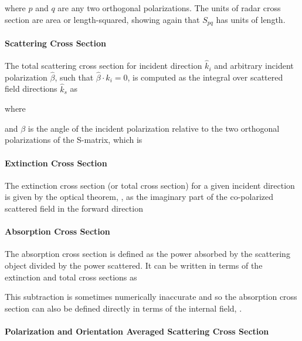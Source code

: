 \noindent where $p$ and $q$ are any two orthogonal polarizations. The units of radar cross section are area or length-squared, showing again that $S_{pq}$ has units of length.

\paragraph{Scattering Cross Section} The total scattering cross section for incident direction $\hat{k}_i$ and arbitrary incident polarization $\hat{\beta}$, such that $\hat{\beta} \cdot \hat{k}_i = 0$, is computed as the integral over scattered field directions $\hat{k}_s$ as

\noindent where

\noindent and $\beta$ is the angle of the incident polarization relative to the two orthogonal polarizations of the S-matrix, which is 

\paragraph{Extinction Cross Section} The extinction cross section (or total cross section) for a given incident direction is given by the optical theorem, \cite{zhang2019generalized}, as the imaginary part of the co-polarized scattered field in the forward direction

\paragraph{Absorption Cross Section} The absorption cross section is defined as the power absorbed by the scattering object divided by the power scattered. It can be written in terms of the extinction and total cross sections as 

This subtraction is sometimes numerically inaccurate and so the absorption cross section can also be defined directly in terms of the internal field, \cite{yurkin2007discrete}.

\paragraph{Polarization and Orientation Averaged Scattering Cross Section}

